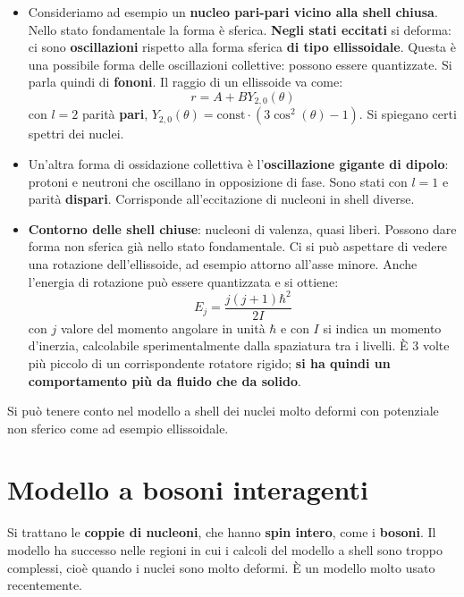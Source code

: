 \documentclass[a4paper,11pt,twoside,openany]{book}
\theoremstyle{definition}
\theoremstyle{plain}
\theoremstyle{plain}
\theoremstyle{definition}
\begin{document}
\begin{itemize}
\item Consideriamo ad esempio un \textbf{nucleo pari-pari vicino alla shell chiusa}. Nello stato fondamentale la forma è sferica. \textbf{Negli stati eccitati} si deforma: ci sono \textbf{oscillazioni} rispetto alla forma sferica \textbf{di tipo ellissoidale}. Questa è una possibile forma delle oscillazioni collettive: possono essere quantizzate. Si parla quindi di \textbf{fononi}. Il raggio di un ellissoide va come:
\begin{equation}
r=A+BY_{2,0}(\theta)
\end{equation}
con $l=2$ parità \textbf{pari}, $Y_{2,0}(\theta)=\textrm{const}\cdot(3\cos^2\left(\theta\right) -1)$. Si spiegano certi spettri dei nuclei.

\item Un'altra forma di ossidazione collettiva è l'\textbf{oscillazione gigante di dipolo}: protoni e neutroni che oscillano in opposizione di fase. Sono stati con $l=1$ e parità \textbf{dispari}. Corrisponde all'eccitazione di nucleoni in shell diverse.

\item \textbf{Contorno delle shell chiuse}: nucleoni di valenza, quasi liberi. Possono dare forma non sferica già nello stato fondamentale. Ci si può aspettare di vedere una rotazione dell'ellissoide, ad esempio attorno all'asse minore. Anche l'energia di rotazione può essere quantizzata e si ottiene:
\begin{equation}
E_j=\frac{j(j+1)\hbar^2}{2I}
\end{equation}
con $j$ valore del momento angolare in unità $\hbar$ e con $I$ si indica un momento d'inerzia, calcolabile sperimentalmente dalla spaziatura tra i livelli. È 3 volte più piccolo di un corrispondente rotatore rigido; \textbf{si ha quindi un comportamento più da fluido che da solido}.
\end{itemize}

Si può tenere conto nel modello a shell dei nuclei molto deformi con potenziale non sferico come ad esempio ellissoidale.

\section{Modello a bosoni interagenti} %
Si trattano le \textbf{coppie di nucleoni}, che hanno \textbf{spin intero}, come i \textbf{bosoni}. Il modello ha successo nelle regioni in cui i calcoli del modello a shell sono troppo complessi, cioè quando i nuclei sono molto deformi. È un modello molto usato recentemente.
\end{document}
